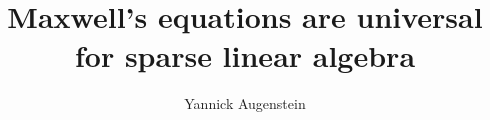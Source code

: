 \documentclass[11pt,a4paper]{article}
\title{\textbf{Maxwell's equations are universal for sparse linear algebra}}
\author{Yannick Augenstein}
\date{}
\theoremstyle{definition}
\theoremstyle{remark}
\begin{document}
\maketitle
\begin{abstract}

\end{abstract}






\begingroup\renewcommand{\bibfont}{\footnotesize}\setlength{\bibsep}{1pt}


\endgroup
\clearpage

\end{document}
